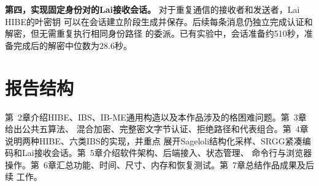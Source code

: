 \textbf{第四，实现固定身份对的Lai接收会话。} 对于重复通信的接收者和发送者，Lai HIBE的叶密钥
可以在会话建立阶段生成并保存。后续每条消息仍独立完成认证和解密，但无需重复执行相同身份路径
的委派。已有实验中，会话准备约510秒，准备完成后的解密中位数为28.6秒。

\section{报告结构}

第~2章介绍HIBE、IBS、IB-ME通用构造以及本作品涉及的格困难问题。第~3章给出公共五算法、
混合加密、完整密文字节认证、拒绝路径和代表组合。第~4章说明两种HIBE、六类IBS的实现，并重点
展开Sageloli结构化采样、SRGG紧凑编码和Lai接收会话。第~5章介绍软件架构、后端接入、状态管理、
命令行与浏览器操作。第~6章汇总功能、时间、尺寸、内存和恢复测试。第~7章总结作品成果及后续
工作。
